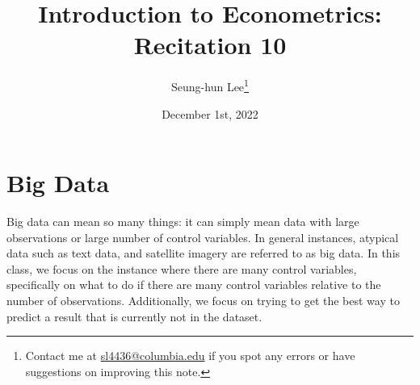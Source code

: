 \documentclass[12pt]{article}
\title{Introduction to Econometrics: Recitation 10}
\theoremstyle{definition}
\theoremstyle{property}
\theoremstyle{assumption}
\theoremstyle{example}
\theoremstyle{comment}
\begin{document}
\linespread{1.25}
\onehalfspacing

\author{Seung-hun Lee\footnote{Contact me at \href{mailto:sl4436@columbia.edu}{sl4436@columbia.edu} if you spot any errors or have suggestions on improving this note.}}
\date{December 1st, 2022}
\maketitle
\thispagestyle{firstpage}


\section{Big Data}
Big data can mean so many things: it can simply mean data with large observations or large number of control variables. In general instances, atypical data such as text data, and satellite imagery are referred to as big data. In this class, we focus on the instance where there are many control variables, specifically on what to do if there are many control variables relative to the number of observations. Additionally, we focus on trying to get the best way to predict a result that is currently not in the dataset.
\par\medskip 
\end{document}
